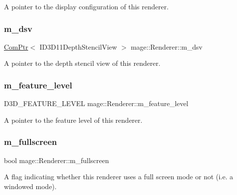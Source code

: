 A pointer to the display configuration of this renderer. \hypertarget{classmage_1_1_renderer_a27a62437e26957890563a68ebcde1909}{}\label{classmage_1_1_renderer_a27a62437e26957890563a68ebcde1909} 
\subsubsection{\texorpdfstring{m\+\_\+dsv}{m\_dsv}}
{\footnotesize\ttfamily \hyperlink{namespacemage_ae74f374780900893caa5555d1031fd79}{Com\+Ptr}$<$ I\+D3\+D11\+Depth\+Stencil\+View $>$ mage\+::\+Renderer\+::m\+\_\+dsv\hspace{0.3cm}{\ttfamily [private]}}

A pointer to the depth stencil view of this renderer. \hypertarget{classmage_1_1_renderer_aa97b108ef58f7d41ddb527f6ba2bfdf9}{}\label{classmage_1_1_renderer_aa97b108ef58f7d41ddb527f6ba2bfdf9} 
\subsubsection{\texorpdfstring{m\+\_\+feature\+\_\+level}{m\_feature\_level}}
{\footnotesize\ttfamily D3\+D\+\_\+\+F\+E\+A\+T\+U\+R\+E\+\_\+\+L\+E\+V\+EL mage\+::\+Renderer\+::m\+\_\+feature\+\_\+level\hspace{0.3cm}{\ttfamily [private]}}

A pointer to the feature level of this renderer. \hypertarget{classmage_1_1_renderer_a72bb88b17491bd388460afae9d207b0a}{}\label{classmage_1_1_renderer_a72bb88b17491bd388460afae9d207b0a} 
\subsubsection{\texorpdfstring{m\+\_\+fullscreen}{m\_fullscreen}}
{\footnotesize\ttfamily bool mage\+::\+Renderer\+::m\+\_\+fullscreen\hspace{0.3cm}{\ttfamily [private]}}

A flag indicating whether this renderer uses a full screen mode or not (i.\+e. a windowed mode). \hypertarget{classmage_1_1_renderer_adadc1028e5ad6551abbecfd8529e4aa1}{}\label{classmage_1_1_renderer_adadc1028e5ad6551abbecfd8529e4aa1} 
